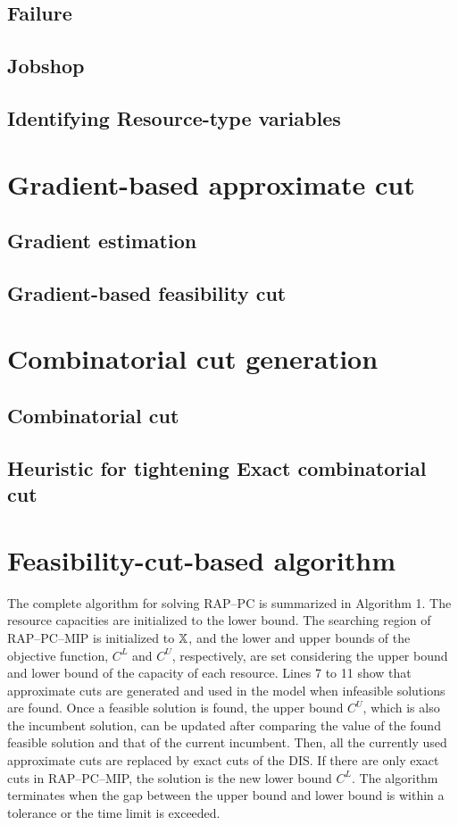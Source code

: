 \documentclass[]{interact}
\theoremstyle{plain}%
\theoremstyle{definition}
\theoremstyle{remark}
\begin{document}
\newpage
\subsection{Failure}



\newpage
\subsection{Jobshop}


\subsection{Identifying Resource-type variables}


\section{Gradient-based approximate cut}
\subsection{Gradient estimation}
\subsection{Gradient-based feasibility cut}


\section{Combinatorial cut generation}
\subsection{Combinatorial cut}
\subsection{Heuristic for tightening Exact combinatorial cut}

\section{Feasibility-cut-based algorithm}
The complete algorithm for solving RAP--PC is summarized in Algorithm 1. The resource capacities are initialized to the lower bound. The searching region of RAP--PC--MIP is initialized to $\Bbb{X}$, and the lower and upper bounds of the objective function, $C^L$ and $C^U$, respectively,  are set considering the upper bound and lower bound of the capacity of each resource. Lines 7 to 11 show that approximate cuts are generated and used in the model when infeasible solutions are found. Once a feasible solution is found, the upper bound $C^U$, which is also the incumbent solution, can be updated after comparing the value of the found feasible solution and that of the current incumbent. Then, all the currently used approximate cuts are replaced by exact cuts of the DIS. If there are only exact cuts in RAP--PC--MIP, the solution is the new lower bound $C^L$. The algorithm terminates when the gap between the upper bound and lower bound is within a tolerance or the time limit is exceeded.
\end{document}

